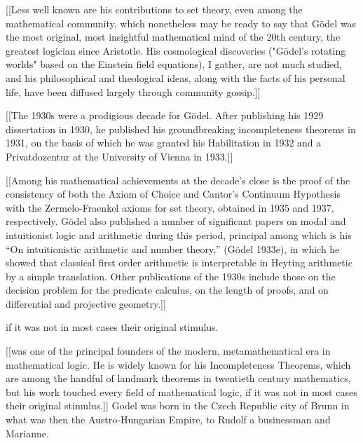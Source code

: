 \documentclass[7pt]{article}
\begin{document}
[[Less well known are his contributions to set theory, even among the mathematical community, which nonetheless may be ready to say that Gödel was the most original, most insightful mathematical mind of the 20th century, the greatest logician since Aristotle. His cosmological discoveries ("Gödel's rotating worlds" based on the Einstein field equations), I gather, are not much studied, and his philosophical and theological ideas, along with the facts of his personal life, have been diffused largely through community gossip.]]

[[The 1930s were a prodigious decade for Gödel. After publishing his 1929 dissertation in 1930, he published his groundbreaking incompleteness theorems in 1931, on the basis of which he was granted his Habilitation in 1932 and a Privatdozentur at the University of Vienna in 1933.]]

[[Among his mathematical achievements at the decade's close is the proof of the consistency of both the Axiom of Choice and Cantor's Continuum Hypothesis with the Zermelo-Fraenkel axioms for set theory, obtained in 1935 and 1937, respectively. Gödel also published a number of significant papers on modal and intuitionist logic and arithmetic during this period, principal among which is his “On intuitionistic arithmetic and number theory,” (Gödel 1933e), in which he showed that classical first order arithmetic is interpretable in Heyting arithmetic by a simple translation. Other publications of the 1930s include those on the decision problem for the predicate calculus, on the length of proofs, and on differential and projective geometry.]]


if it was not in most cases their original stimulus.


[[was one of the principal founders of the modern, metamathematical era in mathematical logic. He is widely known for his Incompleteness Theorems, which are among the handful of landmark theorems in twentieth century mathematics, but his work touched every field of mathematical logic, if it was not in most cases their original stimulus.]] Godel was born in the Czech Republic city of Brunn in what was then the Austro-Hungarian Empire, to Rudolf a businessman and Marianne.

 
\end{document}
